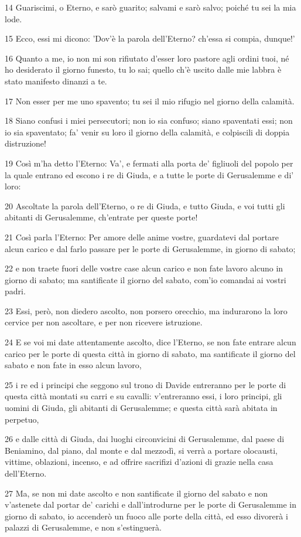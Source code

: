 \par 14 Guariscimi, o Eterno, e sarò guarito; salvami e sarò salvo; poiché tu sei la mia lode.
\par 15 Ecco, essi mi dicono: 'Dov'è la parola dell'Eterno? ch'essa si compia, dunque!'
\par 16 Quanto a me, io non mi son rifiutato d'esser loro pastore agli ordini tuoi, né ho desiderato il giorno funesto, tu lo sai; quello ch'è uscito dalle mie labbra è stato manifesto dinanzi a te.
\par 17 Non esser per me uno spavento; tu sei il mio rifugio nel giorno della calamità.
\par 18 Siano confusi i miei persecutori; non io sia confuso; siano spaventati essi; non io sia spaventato; fa' venir su loro il giorno della calamità, e colpiscili di doppia distruzione!
\par 19 Così m'ha detto l'Eterno: Va', e fermati alla porta de' figliuoli del popolo per la quale entrano ed escono i re di Giuda, e a tutte le porte di Gerusalemme e di' loro:
\par 20 Ascoltate la parola dell'Eterno, o re di Giuda, e tutto Giuda, e voi tutti gli abitanti di Gerusalemme, ch'entrate per queste porte!
\par 21 Così parla l'Eterno: Per amore delle anime vostre, guardatevi dal portare alcun carico e dal farlo passare per le porte di Gerusalemme, in giorno di sabato;
\par 22 e non traete fuori delle vostre case alcun carico e non fate lavoro alcuno in giorno di sabato; ma santificate il giorno del sabato, com'io comandai ai vostri padri.
\par 23 Essi, però, non diedero ascolto, non porsero orecchio, ma indurarono la loro cervice per non ascoltare, e per non ricevere istruzione.
\par 24 E se voi mi date attentamente ascolto, dice l'Eterno, se non fate entrare alcun carico per le porte di questa città in giorno di sabato, ma santificate il giorno del sabato e non fate in esso alcun lavoro,
\par 25 i re ed i principi che seggono sul trono di Davide entreranno per le porte di questa città montati su carri e su cavalli: v'entreranno essi, i loro principi, gli uomini di Giuda, gli abitanti di Gerusalemme; e questa città sarà abitata in perpetuo,
\par 26 e dalle città di Giuda, dai luoghi circonvicini di Gerusalemme, dal paese di Beniamino, dal piano, dal monte e dal mezzodì, si verrà a portare olocausti, vittime, oblazioni, incenso, e ad offrire sacrifizi d'azioni di grazie nella casa dell'Eterno.
\par 27 Ma, se non mi date ascolto e non santificate il giorno del sabato e non v'astenete dal portar de' carichi e dall'introdurne per le porte di Gerusalemme in giorno di sabato, io accenderò un fuoco alle porte della città, ed esso divorerà i palazzi di Gerusalemme, e non s'estinguerà.

